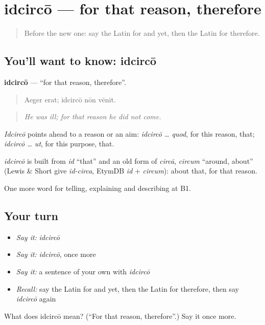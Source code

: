 \section[idcircō]{idcircō — for that reason, therefore}

\label{lesson:LA-C366-idcirco}



\begin{quote}
Before the new one: say the Latin for and yet, then the Latin for therefore.
\end{quote}

\subsection*{You'll want to know: idcircō}
\textbf{idcircō} — \textquotedblleft{}for that reason, therefore\textquotedblright{}.

\begin{quote}
Aeger erat; idcircō nōn vēnit.
\end{quote}

\begin{quote}
\emph{He was ill; for that reason he did not come.}
\end{quote}

\emph{Idcircō} points ahead to a reason or an aim: \emph{idcircō … quod}, for this reason, that; \emph{idcircō … ut}, for this purpose, that.

\begin{cousinweb}
\emph{idcircō} is built from \emph{id} \textquotedblleft{}that\textquotedblright{} and an old form of \emph{circā}, \emph{circum} \textquotedblleft{}around, about\textquotedblright{} (Lewis \& Short give \emph{id-circa}, EtymDB \emph{id} + \emph{circum}): about that, for that reason.
\end{cousinweb}

\begin{grammarlens}[title={What you've built}]
One more word for telling, explaining and describing at B1.
\end{grammarlens}

\subsection*{Your turn}
\begin{itemize}
\raggedright
  \item \emph{Say it:} \emph{idcircō}
  \item \emph{Say it:} \emph{idcircō}, once more
  \item \emph{Say it:} a sentence of your own with \emph{idcircō}
  \item \emph{Recall:} say the Latin for and yet, then the Latin for therefore, then say \emph{idcircō} again
\end{itemize}

\begin{tcolorbox}[breakable,colback=teal!4,colframe=teal!35!black,title={Before you move on}]
What does idcircō mean? (\textquotedblleft{}For that reason, therefore\textquotedblright{}.) Say it once more.
\end{tcolorbox}
